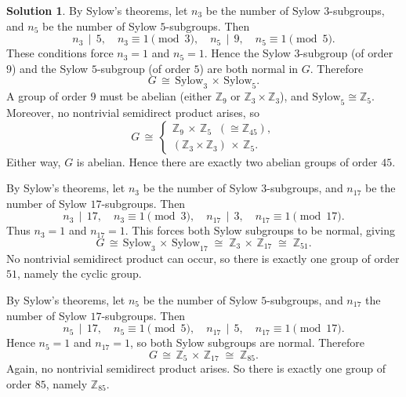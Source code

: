 \documentclass[12pt]{article}
\theoremstyle{definition} %
\newtheorem{solution}{Solution}
\theoremstyle{plain} %
\begin{document}
\begin{solution}


By Sylow's theorems, let $n_3$ be the number of Sylow $3$-subgroups, and $n_5$ be the number of Sylow $5$-subgroups. Then
\[
n_3 \,\mid\, 5, \quad n_3 \equiv 1 \pmod 3, 
\quad
n_5 \,\mid\, 9, \quad n_5 \equiv 1 \pmod 5.
\]
These conditions force $n_3 = 1$ and $n_5 = 1$. Hence the Sylow $3$-subgroup (of order $9$) and the Sylow $5$-subgroup (of order $5$) are both normal in $G$. Therefore
\[
G \,\cong\, \mathrm{Sylow}_3 \,\times\, \mathrm{Sylow}_5.
\]
A group of order $9$ must be abelian (either $\mathbb{Z}_9$ or $\mathbb{Z}_3\times\mathbb{Z}_3$), and $\mathrm{Sylow}_5 \cong \mathbb{Z}_5$. Moreover, no nontrivial semidirect product arises, so
\[
G \,\cong\, 
\begin{cases}
\mathbb{Z}_9 \,\times\, \mathbb{Z}_5 \;\;(\cong \mathbb{Z}_{45}),\\
(\mathbb{Z}_3\times \mathbb{Z}_3)\,\times\, \mathbb{Z}_5.
\end{cases}
\]
Either way, $G$ is abelian. Hence there are exactly two abelian groups of order $45$.


By Sylow's theorems, let $n_3$ be the number of Sylow $3$-subgroups, and $n_{17}$ be the number of Sylow $17$-subgroups. Then
\[
n_3 \,\mid\, 17,\quad n_3 \equiv 1 \pmod 3,
\quad
n_{17} \,\mid\, 3,\quad n_{17} \equiv 1 \pmod{17}.
\]
Thus $n_3 = 1$ and $n_{17} = 1$. This forces both Sylow subgroups to be normal, giving
\[
G \,\cong\, \mathrm{Sylow}_3 \,\times\, \mathrm{Sylow}_{17}
\;\cong\;
\mathbb{Z}_3 \,\times\, \mathbb{Z}_{17}
\;\cong\;
\mathbb{Z}_{51}.
\]
No nontrivial semidirect product can occur, so there is exactly one group of order $51$, namely the cyclic group.


By Sylow's theorems, let $n_5$ be the number of Sylow $5$-subgroups, and $n_{17}$ the number of Sylow $17$-subgroups. Then
\[
n_5 \,\mid\, 17,\quad n_5 \equiv 1 \pmod 5,
\quad
n_{17} \,\mid\, 5,\quad n_{17} \equiv 1 \pmod{17}.
\]
Hence $n_5=1$ and $n_{17}=1$, so both Sylow subgroups are normal. Therefore
\[
G \,\cong\, \mathbb{Z}_5 \,\times\, \mathbb{Z}_{17}
\;\cong\;
\mathbb{Z}_{85}.
\]
Again, no nontrivial semidirect product arises. So there is exactly one group of order $85$, namely $\mathbb{Z}_{85}$.
\end{solution}
\end{document}
